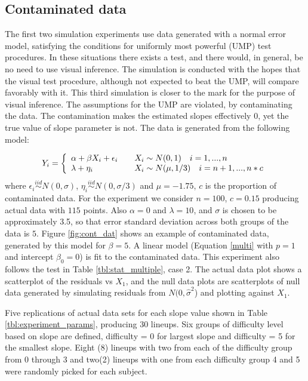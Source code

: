 \documentclass{article}
\begin{document}
\subsection{Contaminated data}

The first two simulation experiments use data generated with a normal error model, satisfying the conditions for uniformly most powerful (UMP) test procedures. In these situations there exists a test, and there would, in general, be no need to use visual inference. The simulation is conducted with the hopes that the visual test procedure, although not expected to beat the UMP, will compare favorably with it. This third simulation is closer to the mark for the purpose of visual inference. The assumptions for the UMP are violated, by contaminating the data. The contamination makes the estimated slopes effectively 0, yet the true value of slope parameter is not.  The data is generated from the following model:

\[
  Y_i = \left\{
  \begin{array}{l l}
    \alpha+\beta X_i + \epsilon_i  & \quad  X_i \sim N(0,1) \quad  i =1,...,n\\
    \lambda+ \eta_i & \quad X_i \sim N(\mu,1/3) \quad  i=n+1, ...,n*c\\
  \end{array} \right.
\]
where $\epsilon_i \stackrel{iid}\sim N(0,\sigma)$, $\eta_i \stackrel{iid}\sim N(0,\sigma/3)$ and $\mu = -1.75$, $c$ is the proportion of contaminated data. For the experiment we consider $n=100$, $c=0.15$ producing actual data with $115$ points. Also $\alpha=0$ and $\lambda=10$, and $\sigma$ is chosen to be approximately 3.5, so that error standard deviation across both groups of the data is $5$. Figure \ref{fig:cont_dat} shows an example of contaminated data, generated by this model for $\beta=5$.  A linear model (Equation \ref{multi} with $p=1$  and intercept $\beta_0=0$) is fit to the contaminated data. This experiment also follows the test in Table \ref{tbl:stat_multiple}, case 2. The actual data plot shows a scatterplot of the residuals vs $X_1$, and the null data plots are scatterplots of null data generated by simulating residuals from $N(0, {\hat{\sigma}}^2$) and plotting against $X_1$. 

Five replications of actual data sets for each slope value shown in Table \ref{tbl:experiment_params}, producing 30 lineups. Six groups of difficulty level based on slope are defined, difficulty = 0 for largest slope and difficulty = 5 for the smallest slope.    Eight (8) lineups with two from each of the difficulty group from 0 through 3 and two(2) lineups with one from each difficulty group 4 and 5 were randomly picked for each subject. 
\end{document}
